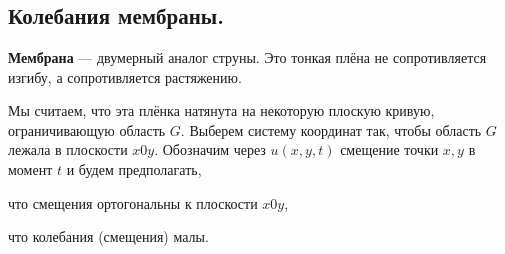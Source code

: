 \chapter{}
\label{lecture15}
\section{Колебания мембраны.}
\label{lecture15section1}
\begin{_def}
	\textbf{Мембрана} --- двумерный аналог струны. Это тонкая плёна не сопротивляется изгибу, а сопротивляется растяжению.
\end{_def}
Мы считаем, что эта плёнка натянута на некоторую плоскую кривую, ограничивающую область $G$. Выберем систему координат так, чтобы область $G$ лежала в плоскости $x0y$. Обозначим через $u(x,y,t)$ смещение точки $x,y$ в момент $t$ и будем предполагать,
\begin{enumerate1}
	\item что смещения ортогональны к плоскости $x0y$,
	\item что колебания (смещения) малы.
\end{enumerate1}





